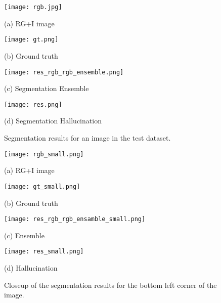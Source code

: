 \documentclass[journal]{IEEEtran}
\begin{document}
\label{sec:vaihingen}
\begin{figure}[htbp]
\begin{minipage}[b]{0.48\linewidth}
  \centering
 \texttt{[image: rgb.jpg]}
  \centerline{(a) RG+I image}\medskip
\end{minipage}
\hfill
\begin{minipage}[b]{0.48\linewidth}
  \centering
 \texttt{[image: gt.png]}
  \centerline{(b) Ground truth}\medskip
\end{minipage}
\begin{minipage}[b]{.48\linewidth}
  \centering
  \texttt{[image: res\_rgb\_rgb\_ensemble.png]}
  \centerline{(c) Segmentation Ensemble}\medskip
\end{minipage}
\hfill
\begin{minipage}[b]{0.48\linewidth}
  \centering
  \texttt{[image: res.png]}
  \centerline{(d) Segmentation Hallucination}\medskip
\end{minipage}
%
\caption{Segmentation results for an image in the test dataset.}
\label{fig:res}
%
\end{figure}

\begin{figure}[htbp]
\begin{minipage}[b]{0.48\linewidth}
  \centering
 \texttt{[image: rgb\_small.png]}
  \centerline{(a) RG+I image}\medskip
\end{minipage}
\hfill
\begin{minipage}[b]{0.48\linewidth}
  \centering
 \texttt{[image: gt\_small.png]}
  \centerline{(b) Ground truth}\medskip
\end{minipage}
\begin{minipage}[b]{0.48\linewidth}
  \centering
 \texttt{[image: res\_rgb\_rgb\_ensamble\_small.png]}
  \centerline{(c) Ensemble}\medskip
\end{minipage}
\hfill
\begin{minipage}[b]{0.48\linewidth}
  \centering
 \texttt{[image: res\_small.png]}
  \centerline{(d) Hallucination}\medskip
\end{minipage}
%
\caption{Closeup of the segmentation results for the bottom left corner of the image.}
\label{fig:res_close}
%
\end{figure}
\end{document}
